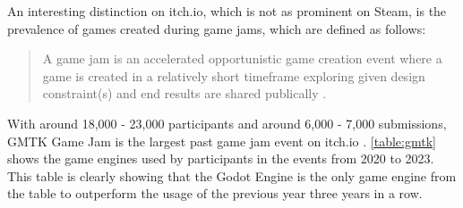 An interesting distinction on itch.io, which is not as prominent on Steam, is the prevalence of games created during game jams, which are defined as follows:
\blockquote{A game jam is an accelerated opportunistic game creation event where a game is created in a relatively short timeframe exploring given design constraint(s) and end results are shared publically \cite{game-jam-definition}.}
With around 18,000 - 23,000 participants and around 6,000 - 7,000 submissions, GMTK Game Jam is the largest past game jam event on itch.io \cite{gmtk-game-jam-2021, gmtk-game-jam-2022, gmtk-game-jam-2023}.
\autoref{table:gmtk} shows the game engines used by participants in the events from 2020 to 2023.
This table is clearly showing that the Godot Engine is the only game engine from the table to outperform the usage of the previous year three years in a row. \\


